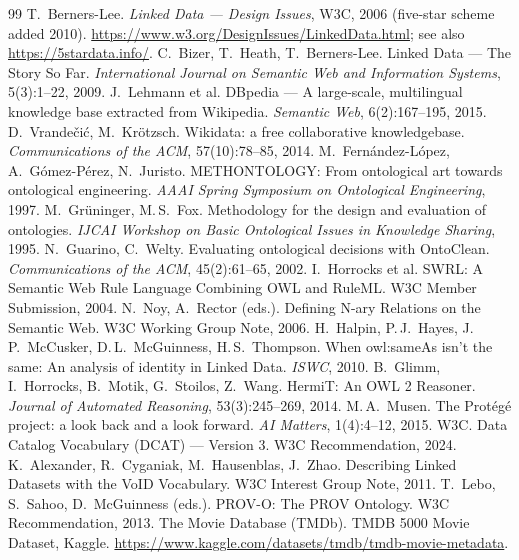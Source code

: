 \documentclass[11pt,a4paper]{article}
\begin{document}
\begin{thebibliography}{99}\small
{} T.~Berners-Lee. \emph{Linked Data --- Design Issues}, W3C, 2006 (five-star scheme added 2010). \url{https://www.w3.org/DesignIssues/LinkedData.html}; see also \url{https://5stardata.info/}.
 C.~Bizer, T.~Heath, T.~Berners-Lee. Linked Data --- The Story So Far. \emph{International Journal on Semantic Web and Information Systems}, 5(3):1--22, 2009.
 J.~Lehmann et al. DBpedia --- A large-scale, multilingual knowledge base extracted from Wikipedia. \emph{Semantic Web}, 6(2):167--195, 2015.
 D.~Vrandečić, M.~Krötzsch. Wikidata: a free collaborative knowledgebase. \emph{Communications of the ACM}, 57(10):78--85, 2014.
 M.~Fernández-López, A.~Gómez-Pérez, N.~Juristo. METHONTOLOGY: From ontological art towards ontological engineering. \emph{AAAI Spring Symposium on Ontological Engineering}, 1997.
 M.~Grüninger, M.\,S.~Fox. Methodology for the design and evaluation of ontologies. \emph{IJCAI Workshop on Basic Ontological Issues in Knowledge Sharing}, 1995.
 N.~Guarino, C.~Welty. Evaluating ontological decisions with OntoClean. \emph{Communications of the ACM}, 45(2):61--65, 2002.
 I.~Horrocks et al. SWRL: A Semantic Web Rule Language Combining OWL and RuleML. W3C Member Submission, 2004.
 N.~Noy, A.~Rector (eds.). Defining N-ary Relations on the Semantic Web. W3C Working Group Note, 2006.
 H.~Halpin, P.\,J.~Hayes, J.\,P.~McCusker, D.\,L.~McGuinness, H.\,S.~Thompson. When owl:sameAs isn't the same: An analysis of identity in Linked Data. \emph{ISWC}, 2010.
 B.~Glimm, I.~Horrocks, B.~Motik, G.~Stoilos, Z.~Wang. HermiT: An OWL 2 Reasoner. \emph{Journal of Automated Reasoning}, 53(3):245--269, 2014.
 M.\,A.~Musen. The Protégé project: a look back and a look forward. \emph{AI Matters}, 1(4):4--12, 2015.
 W3C. Data Catalog Vocabulary (DCAT) --- Version 3. W3C Recommendation, 2024.
 K.~Alexander, R.~Cyganiak, M.~Hausenblas, J.~Zhao. Describing Linked Datasets with the VoID Vocabulary. W3C Interest Group Note, 2011.
 T.~Lebo, S.~Sahoo, D.~McGuinness (eds.). PROV-O: The PROV Ontology. W3C Recommendation, 2013.
 The Movie Database (TMDb). TMDB 5000 Movie Dataset, Kaggle. \url{https://www.kaggle.com/datasets/tmdb/tmdb-movie-metadata}.
\end{thebibliography}
\end{document}
